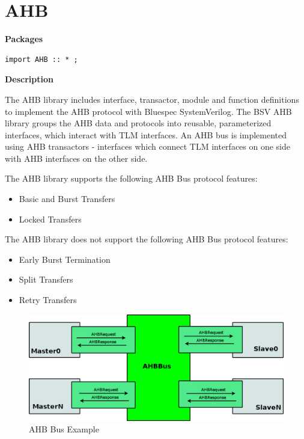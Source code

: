 \documentclass[twoside,letterpaper]{article}
\begin{document}
 \section{AHB}

{\bf Packages}

\begin{verbatim}
import AHB :: * ;
\end{verbatim}







{\bf Description}

The AHB library includes interface, transactor,  module and
function definitions to
implement the AHB protocol with Bluespec SystemVerilog.  The BSV AHB
library  groups the AHB data and protocols
into  reusable, parameterized
interfaces, which interact with TLM interfaces.  An AHB bus is
implemented  using AHB transactors  -
interfaces  which connect TLM interfaces on one side with
AHB interfaces on the other side.  


The AHB library supports the following AHB Bus protocol features:
\begin{itemize}
\item Basic and Burst Transfers
\item Locked Transfers
\end{itemize}

The AHB library does not support the following  AHB Bus protocol features:
\begin{itemize}
\item Early Burst Termination
\item Split Transfers
\item Retry Transfers
\end{itemize}

\begin{figure}[ht]
\begin{center}
\includegraphics[height = 2 in]{AHBex2}
\caption{AHB Bus Example}
\label{AHBbus}
\end{center}
\end{figure}
\end{document}
